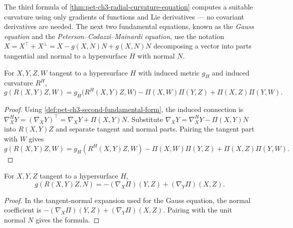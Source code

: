 \begin{remark}
  \label{rem:pet-ch3-tangential-normal-decomposition}
  \leanok
  The third formula of \cref{thm:pet-ch3-radial-curvature-equation} computes a
  suitable curvature using only gradients of functions and Lie derivatives — no
  covariant derivatives are needed. The next two fundamental equations, known as
  the \emph{Gauss equation} and the \emph{Peterson--Codazzi--Mainardi equation},
  use the notation
  $X=X^\top+X^\perp=X-g(X,N)N+g(X,N)N$
  decomposing a vector into parts tangential and normal to a hypersurface $H$
  with normal $N$.
\end{remark}

\begin{theorem}
  \label{thm:pet-ch3-tangential-curvature-equation}
  \leanok
  For $X,Y,Z,W$ tangent to a hypersurface $H$ with induced metric $g_H$ and
  induced curvature $R^H$,
  \[
    g(R(X,Y)Z,W)=g_H\big(R^H(X,Y)Z,W\big)-\Pi(X,W)\Pi(Y,Z)+\Pi(X,Z)\Pi(Y,W).
  \]
\end{theorem}
\begin{proof}
  \sketch
  Using \cref{def:pet-ch3-second-fundamental-form}, the induced connection is
  $\nabla^H_XY=(\nabla_XY)^\top=\nabla_XY+\Pi(X,Y)N$. Substitute
  $\nabla_XY=\nabla^H_XY-\Pi(X,Y)N$ into $R(X,Y)Z$ and separate tangent and normal
  parts. Pairing the tangent part with $W$ gives
  \[
   g(R(X,Y)Z,W)=g_H(R^H(X,Y)Z,W)
   -\Pi(X,W)\Pi(Y,Z)+\Pi(X,Z)\Pi(Y,W).
  \]
\end{proof}

\begin{theorem}
  \label{thm:pet-ch3-normal-curvature-equation}
  \leanok
  For $X,Y,Z$ tangent to a hypersurface $H$,
  \[
    g(R(X,Y)Z,N)=-(\nabla_X\Pi)(Y,Z)+(\nabla_Y\Pi)(X,Z).
  \]
\end{theorem}
\begin{proof}
  \sketch
  In the tangent-normal expansion used for the Gauss equation, the normal
  coefficient is
  $-(\nabla_X\Pi)(Y,Z)+(\nabla_Y\Pi)(X,Z)$. Pairing with the unit normal $N$
  gives the formula.
\end{proof}

